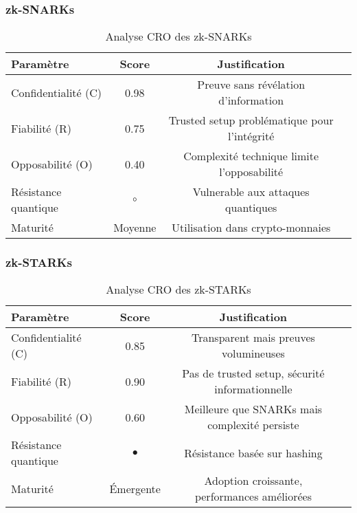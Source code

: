 \subsubsection{zk-SNARKs}
\begin{table}[H]
\centering
\begin{tabular}{lccc}
\hline
\textbf{Paramètre} & \textbf{Score} & \textbf{Justification} \\
\hline
Confidentialité (C) & 0.98 & Preuve sans révélation d'information \\
Fiabilité (R) & 0.75 & Trusted setup problématique pour l'intégrité \\
Opposabilité (O) & 0.40 & Complexité technique limite l'opposabilité \\
Résistance quantique & \(\circ\) & Vulnerable aux attaques quantiques \\
Maturité & Moyenne & Utilisation dans crypto-monnaies \\
\hline
\end{tabular}
\caption{Analyse CRO des zk-SNARKs}
\end{table}

\subsubsection{zk-STARKs}
\begin{table}[H]
\centering
\begin{tabular}{lccc}
\hline
\textbf{Paramètre} & \textbf{Score} & \textbf{Justification} \\
\hline
Confidentialité (C) & 0.85 & Transparent mais preuves volumineuses \\
Fiabilité (R) & 0.90 & Pas de trusted setup, sécurité informationnelle \\
Opposabilité (O) & 0.60 & Meilleure que SNARKs mais complexité persiste \\
Résistance quantique & \(\bullet\) & Résistance basée sur hashing \\
Maturité & Émergente & Adoption croissante, performances améliorées \\
\hline
\end{tabular}
\caption{Analyse CRO des zk-STARKs}
\end{table}

